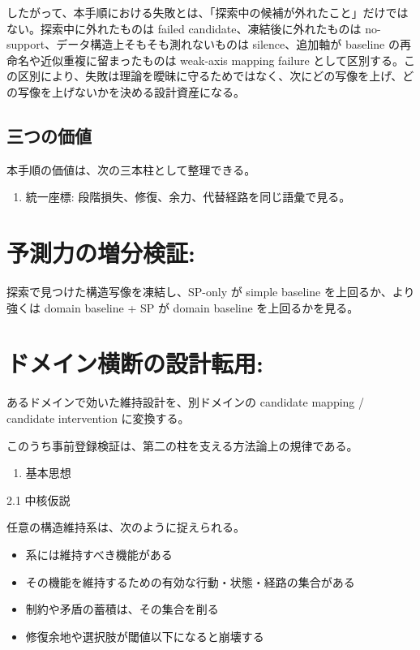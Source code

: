 \documentclass[12pt,a4paper]{article}
\begin{document}
したがって、本手順における失敗とは、「探索中の候補が外れたこと」だけではない。探索中に外れたものは failed candidate、凍結後に外れたものは no-support、データ構造上そもそも測れないものは silence、追加軸が baseline の再命名や近似重複に留まったものは weak-axis mapping failure として区別する。この区別により、失敗は理論を曖昧に守るためではなく、次にどの写像を上げ、どの写像を上げないかを決める設計資産になる。

\subsection{三つの価値}\label{ux4e09ux3064ux306eux4fa1ux5024}

本手順の価値は、次の三本柱として整理できる。

\begin{enumerate}
\def\labelenumi{\arabic{enumi}.}
\tightlist
\item
  統一座標: 段階損失、修復、余力、代替経路を同じ語彙で見る。
\end{enumerate}

\section{予測力の増分検証:}\label{ux4e88ux6e2cux529bux306eux5897ux5206ux691cux8a3c}

探索で見つけた構造写像を凍結し、SP-only が simple baseline を上回るか、より強くは domain baseline + SP が domain baseline を上回るかを見る。

\section{ドメイン横断の設計転用:}\label{ux30c9ux30e1ux30a4ux30f3ux6a2aux65adux306eux8a2dux8a08ux8ee2ux7528}

あるドメインで効いた維持設計を、別ドメインの candidate mapping / candidate intervention に変換する。

このうち事前登録検証は、第二の柱を支える方法論上の規律である。

\begin{enumerate}
\def\labelenumi{\arabic{enumi}.}
\setcounter{enumi}{1}
\tightlist
\item
  基本思想
\end{enumerate}

2.1 中核仮説

任意の構造維持系は、次のように捉えられる。

\begin{itemize}
\tightlist
\item
  系には維持すべき機能がある
\item
  その機能を維持するための有効な行動・状態・経路の集合がある
\item
  制約や矛盾の蓄積は、その集合を削る
\item
  修復余地や選択肢が閾値以下になると崩壊する
\end{itemize}
\end{document}
